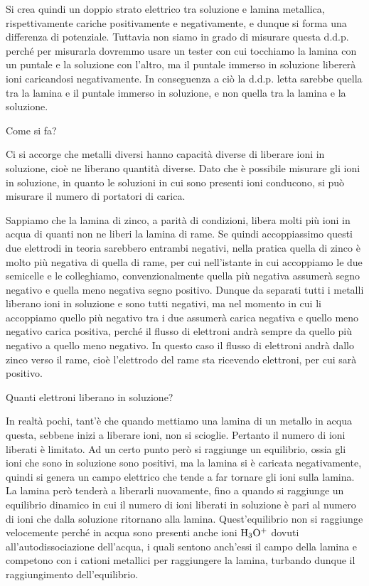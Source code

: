 Si crea quindi un doppio strato elettrico tra soluzione e lamina metallica, rispettivamente cariche positivamente e negativamente, e dunque si forma una differenza di potenziale. Tuttavia non siamo in grado di misurare questa d.d.p. perché per misurarla dovremmo usare un tester con cui tocchiamo la lamina con un puntale e la soluzione con l'altro, ma il puntale immerso in soluzione libererà ioni caricandosi negativamente. In conseguenza a ciò la d.d.p. letta sarebbe quella tra la lamina e il puntale immerso in soluzione, e non quella tra la lamina e la soluzione.

Come si fa?

Ci si accorge che metalli diversi hanno capacità diverse di liberare ioni in soluzione, cioè ne liberano quantità diverse. Dato che è possibile misurare gli ioni in soluzione, in quanto le soluzioni in cui sono presenti ioni conducono, si può misurare il numero di portatori di carica.

Sappiamo che la lamina di zinco, a parità di condizioni, libera molti più ioni in acqua di quanti non ne liberi la lamina di rame. Se quindi accoppiassimo questi due elettrodi in teoria sarebbero entrambi negativi, nella pratica quella di zinco è molto più negativa di quella di rame, per cui nell'istante in cui accoppiamo le due semicelle e le colleghiamo, convenzionalmente quella più negativa assumerà segno negativo e quella meno negativa segno positivo. Dunque da separati tutti i metalli liberano ioni in soluzione e sono tutti negativi, ma nel momento in cui li accoppiamo quello più negativo tra i due assumerà carica negativa e quello meno negativo carica positiva, perché il flusso di elettroni andrà sempre da quello più negativo a quello meno negativo. In questo caso il flusso di elettroni andrà dallo zinco verso il rame, cioè l'elettrodo del rame sta ricevendo elettroni, per cui sarà positivo.

Quanti elettroni liberano in soluzione?

In realtà pochi, tant'è che quando mettiamo una lamina di un metallo in acqua questa, sebbene inizi a liberare ioni, non si scioglie. Pertanto il numero di ioni liberati è limitato. Ad un certo punto però si raggiunge un equilibrio, ossia gli ioni che sono in soluzione sono positivi, ma la lamina si è caricata negativamente, quindi si genera un campo elettrico che tende a far tornare gli ioni sulla lamina. La lamina però tenderà a liberarli nuovamente, fino a quando si raggiunge un equilibrio dinamico in cui il numero di ioni liberati in soluzione è pari al numero di ioni che dalla soluzione ritornano alla lamina. Quest'equilibrio non si raggiunge velocemente perché in acqua sono presenti anche ioni $\rm H_3O^+$ dovuti all'autodissociazione dell'acqua, i quali sentono anch'essi il campo della lamina e competono con i cationi metallici per raggiungere la lamina, turbando dunque il raggiungimento dell'equilibrio.

